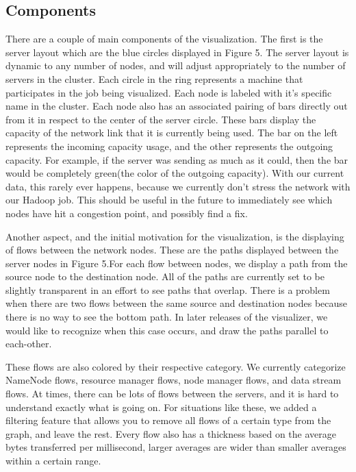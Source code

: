 \subsection{Components}
\label{ssec:comp}
There are a couple of main components of the visualization. The first
is the server layout which are the blue circles displayed in Figure
5. The server layout is dynamic to any number of
nodes, and will adjust appropriately to the number of servers in the
cluster. Each circle in the ring represents a machine that
participates in the job being visualized. Each node is labeled with
it's specific name in the cluster. Each node also has an associated
pairing of bars directly out from it in respect to the center of the
server circle. These bars display the capacity of the network
link that it is currently being used. The bar on the left represents
the incoming capacity usage, and the other represents the outgoing
capacity. For example, if the server was sending as much as it could,
then the bar would be completely green(the color of the outgoing
capacity). With our current data, this rarely ever happens, because we
currently don't stress the network with our Hadoop job. This should be
useful in the future to immediately see which nodes have hit a
congestion point, and possibly find a fix.

Another aspect, and the initial motivation for the visualization, is the
displaying of flows between the network nodes. These are the paths
displayed between the server nodes in Figure 5.For each flow between
nodes, we display a path from the source node to the destination node.
All of the paths are currently set to be slightly transparent in an
effort to see paths that overlap. There is a problem when there are
two flows between the same source and destination nodes because there
is no way to see the bottom path. In later releases of the visualizer,
we would like to recognize when this case occurs, and draw the paths
parallel to each-other.

These flows are also colored by their respective category. We
currently categorize NameNode flows, resource manager flows, node
manager flows, and data stream flows. At times, there can be lots
of flows between the servers, and it is hard to understand exactly
what is going on. For situations like these, we added a filtering
feature that allows you to remove all flows of a certain type from the
graph, and leave the rest. Every flow also has a thickness based on
the average bytes transferred per millisecond, larger averages are wider
than smaller averages within a certain range.

